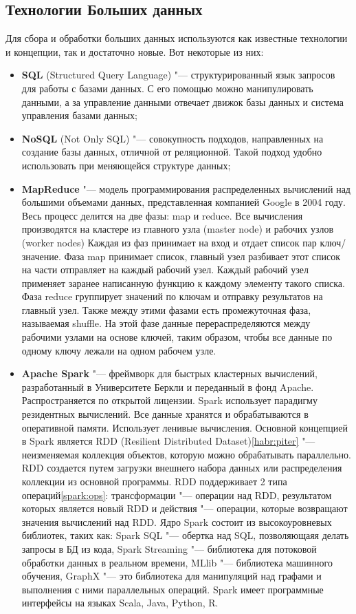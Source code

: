 \documentclass[bachelor, och, pract]{SCWorks}
\begin{document}
\subsection{Технологии  Больших данных}

Для сбора и обработки больших данных используются как известные технологии и концепции, так и достаточно новые. Вот некоторые из них:

\begin{itemize}
	\item \textbf{SQL} (Structured Query Language) "--- структурированный язык запросов для работы с базами данных. С его помощью можно манипулировать данными, а за управление данными отвечает движок базы данных и система управления базами данных;
	\item \textbf{NoSQL} (Not Only SQL) "--- совокупность подходов, направленных на создание базы данных, отличной от реляционной. Такой подход удобно использовать при меняющейся структуре данных;
	\item \textbf{MapReduce} "--- модель программирования распределенных вычислений над большими объемами данных, представленная компанией Google в 2004 году.  Весь процесс делится на две фазы: map и reduce. Все вычисления производятся на кластере из главного узла (master node) и рабочих узлов (worker nodes) Каждая из фаз принимает на вход и отдает список пар ключ/значение. Фаза map принимает список, главный узел разбивает этот список на части отправляет на каждый рабочий узел. Каждый рабочий узел применяет заранее написанную функцию к каждому элементу такого списка. Фаза reduce группирует значений по ключам и отправку результатов на главный узел. Также между этими фазами есть промежуточная фаза, называемая  shuffle. На этой фазе данные перераспределяются между рабочими узлами на основе ключей, таким образом, чтобы все данные по одному ключу лежали на одном рабочем узле.
	\item \textbf{Apache Spark} "--- фреймворк для быстрых кластерных вычислений, разработанный в Университете Беркли и переданный в фонд Apache. Распространяется по открытой лицензии. Spark использует парадигму резидентных вычислений. Все данные хранятся и обрабатываются в оперативной памяти. Использует ленивые вычисления. Основной концепцией в Spark является RDD (Resilient Distributed Dataset)\ref{habr:piter} "--- неизменяемая коллекция объектов, которую можно обрабатывать параллельно. RDD создается путем загрузки внешнего набора данных или распределения коллекции из основной программы. RDD поддерживает 2 типа операций\ref{spark:ops}: трансформации "--- операции над RDD, результатом которых является новый RDD и действия "--- операции, которые возвращают значения вычислений над RDD. Ядро Spark состоит из высокоуровневых библиотек, таких как: Spark SQL "--- обертка над SQL, позволяющаяя делать запросы в БД из кода, Spark Streaming "--- библиотека для потоковой обработки данных в реальном времени, MLlib "--- библиотека машинного обучения, GraphX "--- это библиотека для манипуляций над графами и выполнения с ними параллельных операций. Spark имеет программные интерфейсы на языках Scala, Java, Python, R.
\end{itemize}
\end{document}
